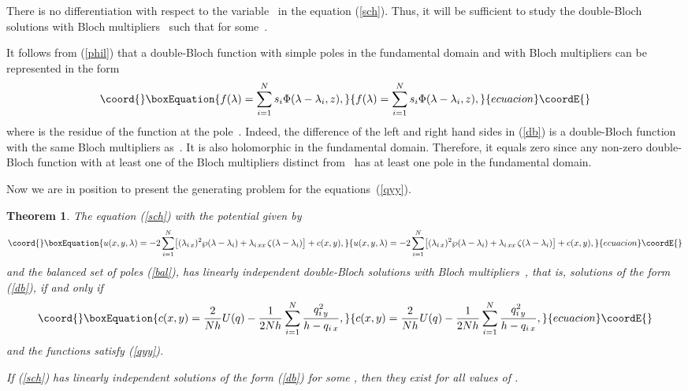 \documentclass[a4paper,11pt]{article}
\theoremstyle{plain}
\newtheorem{teo}{Theorem}
\theoremstyle{remark}
\begin{document}
There is no differentiation with respect to the variable~\myHighlight{$\lambda$}\coordHE{}
in the equation (\ref{sch}). Thus, it will be sufficient to
study the double-Bloch solutions \coordHE{} with
Bloch multipliers~\coordHE{} such that \coordHE{} for some~\coordHE{}.

It follows from (\ref{phil}) that a double-Bloch function \coordHE{}
with simple poles \coordHE{} in the fundamental domain and with Bloch
multipliers \coordHE{}  can be represented in the form
\begin{equation}\coord{}\boxEquation{\label{db}
f(\lambda)=\sum_{i=1}^N s_i \Phi(\lambda-\lambda_i,z),
}{f(\lambda)=\sum_{i=1}^N s_i \Phi(\lambda-\lambda_i,z),
}{ecuacion}\coordE{}\end{equation}
where \coordHE{} is the residue of the function \coordHE{} at the
pole~\coordHE{}. Indeed, the difference of the left and right hand sides
in (\ref{db}) is a double-Bloch function with the same Bloch multipliers
as~\coordHE{}. It is also holomorphic in the fundamental domain.
Therefore, it equals zero since any non-zero double-Bloch
function with at least one of the Bloch multipliers distinct from~\coordHE{}
has at least one pole in the fundamental domain.

Now we are in position to present the generating problem for the
equations~(\ref{qyy}).
\begin{teo}
The equation \emph{(\ref{sch})} with the potential given by
\begin{equation}\coord{}\boxEquation{\label{ut1}
u(x,y,\lambda)=-2\sum_{i=1}^N \bigl[ (\lambda_{i\,x})^2\wp(\lambda-\lambda_i)
+\lambda_{i\,xx}\,\zeta(\lambda-\lambda_i) \bigr] +c(x,y),
}{u(x,y,\lambda)=-2\sum_{i=1}^N \bigl[ (\lambda_{i\,x})^2\wp(\lambda-\lambda_i)
+\lambda_{i\,xx}\,\zeta(\lambda-\lambda_i) \bigr] +c(x,y),
}{ecuacion}\coordE{}\end{equation}
and the balanced set of poles \emph{(\ref{bal})}, has \coordHE{} linearly independent
double-Bloch solutions with Bloch multipliers~\coordHE{},
that is, solutions of the form \emph{(\ref{db})}, if and only if
\begin{equation}\coord{}\boxEquation{\label{c}
c(x,y)=\frac{2}{Nh} U(q)-
\frac{1}{2Nh} \sum_{i=1}^N \frac{q_{i\,y}^2}{h-q_{i\,x}} ,
}{c(x,y)=\frac{2}{Nh} U(q)-
\frac{1}{2Nh} \sum_{i=1}^N \frac{q_{i\,y}^2}{h-q_{i\,x}} ,
}{ecuacion}\coordE{}\end{equation}
and the functions \coordHE{} satisfy \emph{(\ref{qyy})}.

If \emph{(\ref{sch})} has \coordHE{} linearly independent solutions of the form
\emph{(\ref{db})} for some \coordHE{}, then they exist for all values of \coordHE{}.
\end{teo}
\end{document}
